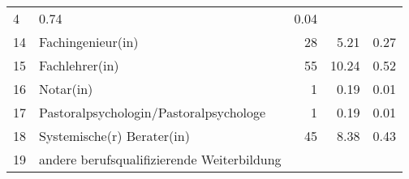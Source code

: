 \begin{longtable}{lXrrr}
       \num{4} &
       \num[round-mode=places,round-precision=2]{0.74} &
         \num[round-mode=places,round-precision=2]{0.04} \\

     14 &
     \multicolumn{1}{X}{ Fachingenieur(in)   } &


       \num{28} &
       \num[round-mode=places,round-precision=2]{5.21} &
         \num[round-mode=places,round-precision=2]{0.27} \\

     15 &
     \multicolumn{1}{X}{ Fachlehrer(in)   } &


       \num{55} &
       \num[round-mode=places,round-precision=2]{10.24} &
         \num[round-mode=places,round-precision=2]{0.52} \\

     16 &
     \multicolumn{1}{X}{ Notar(in)   } &


       \num{1} &
       \num[round-mode=places,round-precision=2]{0.19} &
         \num[round-mode=places,round-precision=2]{0.01} \\

     17 &
     \multicolumn{1}{X}{ Pastoralpsychologin/Pastoralpsychologe   } &


       \num{1} &
       \num[round-mode=places,round-precision=2]{0.19} &
         \num[round-mode=places,round-precision=2]{0.01} \\

     18 &
     \multicolumn{1}{X}{ Systemische(r) Berater(in)   } &


       \num{45} &
       \num[round-mode=places,round-precision=2]{8.38} &
         \num[round-mode=places,round-precision=2]{0.43} \\

     19 &
     \multicolumn{1}{X}{ andere berufsqualifizierende Weiterbildung   } &



\end{longtable}
